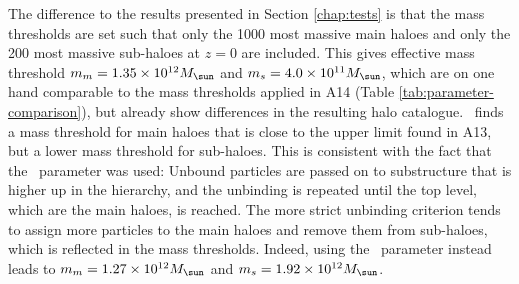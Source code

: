 The difference to the results presented in Section \ref{chap:tests} is that the mass thresholds are set such that only the 1000 most massive main haloes and only the 200 most massive sub-haloes at $z = 0$ are included.
This gives effective mass threshold $m_{m} = 1.35 \times 10^{12} \msol$ and $m_{s} = 4.0 \times 
10^{11}\msol$, which are on one hand comparable to the mass thresholds applied in A14 (Table 
\ref{tab:parameter-comparison}), but already show differences in the resulting halo catalogue.
\phew\ finds a mass threshold for main haloes that is close to the upper limit found in A13, 
but a lower mass threshold for sub-haloes.
This is consistent with the fact that the \sad\ parameter was used:
Unbound particles are passed on to substructure that is higher up in the hierarchy, and the unbinding is repeated until the top level, which are the main haloes, is reached.
The more strict unbinding criterion tends to assign more particles to the main haloes and remove them from sub-haloes, which is reflected in the mass thresholds.
Indeed, using the \nosad\ parameter instead leads to $m_m = 1.27 \times 10^{12}\msol$ and $m_s = 
1.92 \times 10^{12}\msol$.



